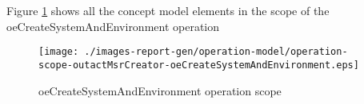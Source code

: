 	\normalsize 
	
	
	
	





Figure \ref{fig:lu.uni.lassy.excalibur.examples.icrash-OM-scopeView-operation-scope-outactMsrCreator-oeCreateSystemAndEnvironment}
shows all the concept model elements in the scope of the oeCreateSystemAndEnvironment operation

\begin{figure}[htbp]
\begin{center}

\texttt{[image: ./images-report-gen/operation-model/operation-scope-outactMsrCreator-oeCreateSystemAndEnvironment.eps]}
\end{center}
\caption[lu.uni.lassy.excalibur.examples.icrash Operation Scope: operation-scope-outactMsrCreator-oeCreateSystemAndEnvironment]{oeCreateSystemAndEnvironment operation scope
}
\label{fig:lu.uni.lassy.excalibur.examples.icrash-OM-scopeView-operation-scope-outactMsrCreator-oeCreateSystemAndEnvironment}
\end{figure}
\vspace{0.5cm}

